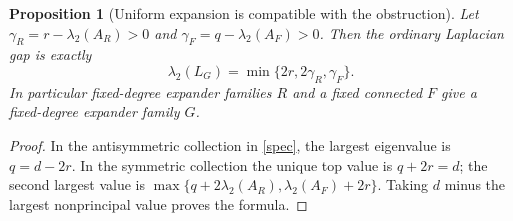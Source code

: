 \documentclass[11pt]{article}
\newtheorem{proposition}{Proposition}
\begin{document}
\begin{proposition}[Uniform expansion is compatible with the obstruction]
Let $\gamma_R=r-\lambda_2(A_R)>0$ and
$\gamma_F=q-\lambda_2(A_F)>0$. Then the ordinary Laplacian gap is exactly
\[
 \lambda_2(L_G)=\min\{2r,2\gamma_R,\gamma_F\}.
\]
In particular fixed-degree expander families $R$ and a fixed connected $F$
give a fixed-degree expander family $G$.
\end{proposition}
\begin{proof}
In the antisymmetric collection in \eqref{spec}, the largest eigenvalue is
$q=d-2r$. In the symmetric collection the unique top value is
$q+2r=d$; the second largest value is
$\max\{q+2\lambda_2(A_R),\lambda_2(A_F)+2r\}$.
Taking $d$ minus the largest nonprincipal value proves the formula.
\end{proof}
\end{document}
